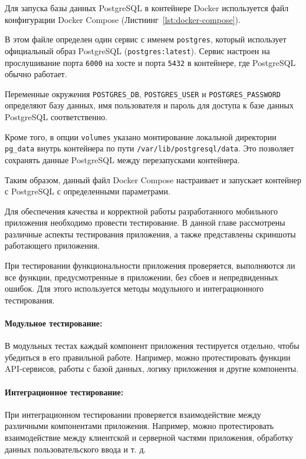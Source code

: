 
Для запуска базы данных PostgreSQL в контейнере Docker используется файл
конфигурации Docker Compose (Листнинг~\ref{lst:docker-compose}).\par
В этом файле определен один сервис с именем \texttt{postgres},
который использует официальный образ PostgreSQL (\texttt{postgres:latest}).
Сервис настроен на прослушивание порта \texttt{6000} на хосте
и порта \texttt{5432} в контейнере, где PostgreSQL обычно работает.\par
Переменные окружения \texttt{POSTGRES\_DB}, \texttt{POSTGRES\_USER}
и \texttt{POSTGRES\_PASSWORD} определяют базу данных, имя пользователя
и пароль для доступа к базе данных PostgreSQL соответственно.\par
Кроме того, в опции \texttt{volumes} указано монтирование локальной директории 
\texttt{pg\_data} внутрь контейнера по пути \texttt{/var/lib/postgresql/data}. 
Это позволяет сохранять данные PostgreSQL между перезапусками контейнера.\par
Таким образом, данный файл Docker Compose настраивает и запускает контейнер
с PostgreSQL с определенными параметрами.


Для обеспечения качества и корректной работы разработанного мобильного приложения необходимо провести тестирование. В данной главе рассмотрены различные аспекты тестирования приложения, а также представлены скриншоты работающего приложения.


При тестировании функциональности приложения проверяется, выполняются ли все функции, предусмотренные в приложении, без сбоев и непредвиденных ошибок. Для этого используется методы модульного и интеграционного тестирования.

\paragraph{Модульное тестирование:} В модульных тестах каждый компонент приложения тестируется отдельно, чтобы убедиться в его правильной работе. Например, можно протестировать функции API-сервисов, работы с базой данных, логику приложения и другие компоненты.

\paragraph{Интеграционное тестирование:} При интеграционном тестировании проверяется взаимодействие между различными компонентами приложения. Например, можно протестировать взаимодействие между клиентской и серверной частями приложения, обработку данных пользовательского ввода и т. д.

